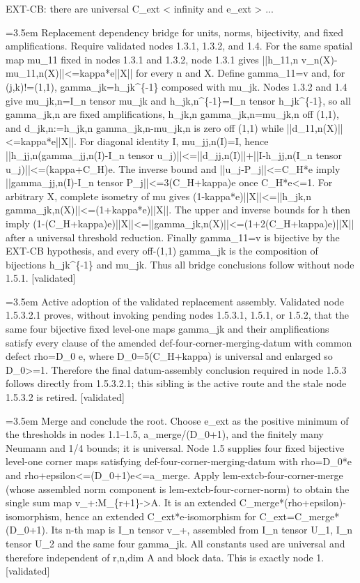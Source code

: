 \documentclass{article}
\newcommand{\step}[1]{\par\noindent\hangindent=3.5em\hangafter=1%
  \makebox[3.5em][l]{\textbf{#1.}}}
\newcommand{\steptag}[1]{\hfill{\small\textsf{[#1]}}}
\begin{document}
\begin{proofbox}{EXT-CB: there are universal C\_ext < infinity and e\_ext > ...}
\step{1.5.3.3} Replacement dependency bridge for units, norms, bijectivity, and fixed amplifications. Require validated nodes 1.3.1, 1.3.2, and 1.4. For the same spatial map mu\_11 fixed in nodes 1.3.1 and 1.3.2, node 1.3.1 gives ||h\_11,n v\_n(X)-mu\_11,n(X)||<=kappa*e||X|| for every n and X. Define gamma\_11=v and, for (j,k)!=(1,1), gamma\_jk=h\_jk\textasciicircum{}\{-1\} composed with mu\_jk. Nodes 1.3.2 and 1.4 give mu\_jk,n=I\_n tensor mu\_jk and h\_jk,n\textasciicircum{}\{-1\}=I\_n tensor h\_jk\textasciicircum{}\{-1\}, so all gamma\_jk,n are fixed amplifications, h\_jk,n gamma\_jk,n=mu\_jk,n off (1,1), and d\_jk,n:=h\_jk,n gamma\_jk,n-mu\_jk,n is zero off (1,1) while ||d\_11,n(X)||<=kappa*e||X||. For diagonal identity I, mu\_jj,n(I)=I, hence ||h\_jj,n(gamma\_jj,n(I)-I\_n tensor u\_j)||<=||d\_jj,n(I)||+||I-h\_jj,n(I\_n tensor u\_j)||<=(kappa+C\_H)e. The inverse bound and ||u\_j-P\_j||<=C\_H*e imply ||gamma\_jj,n(I)-I\_n tensor P\_j||<=3(C\_H+kappa)e once C\_H*e<=1. For arbitrary X, complete isometry of mu gives (1-kappa*e)||X||<=||h\_jk,n gamma\_jk,n(X)||<=(1+kappa*e)||X||. The upper and inverse bounds for h then imply (1-(C\_H+kappa)e)||X||<=||gamma\_jk,n(X)||<=(1+2(C\_H+kappa)e)||X|| after a universal threshold reduction. Finally gamma\_11=v is bijective by the EXT-CB hypothesis, and every off-(1,1) gamma\_jk is the composition of bijections h\_jk\textasciicircum{}\{-1\} and mu\_jk. Thus all bridge conclusions follow without node 1.5.1. \steptag{validated} \\[4pt]
\step{1.5.3.4} Active adoption of the validated replacement assembly. Validated node 1.5.3.2.1 proves, without invoking pending nodes 1.5.3.1, 1.5.1, or 1.5.2, that the same four bijective fixed level-one maps gamma\_jk and their amplifications satisfy every clause of the amended def-four-corner-merging-datum with common defect rho=D\_0 e, where D\_0=5(C\_H+kappa) is universal and enlarged so D\_0>=1. Therefore the final datum-assembly conclusion required in node 1.5.3 follows directly from 1.5.3.2.1; this sibling is the active route and the stale node 1.5.3.2 is retired. \steptag{validated} \\[4pt]
\step{1.6} Merge and conclude the root. Choose e\_ext as the positive minimum of the thresholds in nodes 1.1--1.5, a\_merge/(D\_0+1), and the finitely many Neumann and 1/4 bounds; it is universal. Node 1.5 supplies four fixed bijective level-one corner maps satisfying def-four-corner-merging-datum with rho=D\_0*e and rho+epsilon<=(D\_0+1)e<=a\_merge. Apply lem-extcb-four-corner-merge (whose assembled norm component is lem-extcb-four-corner-norm) to obtain the single sum map v\_+:M\_\{r+1\}->A. It is an extended C\_merge*(rho+epsilon)-isomorphism, hence an extended C\_ext*e-isomorphism for C\_ext=C\_merge*(D\_0+1). Its n-th map is I\_n tensor v\_+, assembled from I\_n tensor U\_1, I\_n tensor U\_2 and the same four gamma\_jk. All constants used are universal and therefore independent of r,n,dim A and block data. This is exactly node 1. \steptag{validated} \\[4pt]
\end{proofbox}
\end{document}
